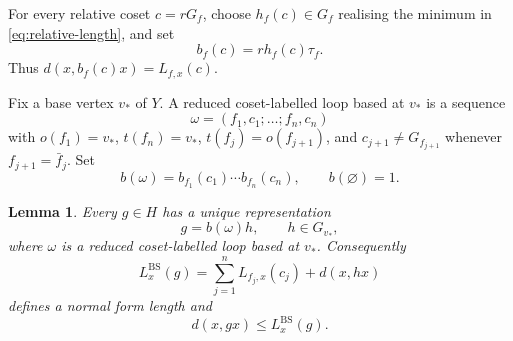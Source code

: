 \documentclass[11pt]{article}
\newtheorem{lemma}[lemma]{Lemma}
\theoremstyle{definition}
\newcommand{\BS}{\mathrm{BS}}
\begin{document}
For every relative coset $c=rG_f$, choose $h_f(c)\in G_f$ realising the minimum in
\eqref{eq:relative-length}, and set
\begin{equation}\label{eq:minimising-label}
 b_f(c)=rh_f(c)\tau_f.
\end{equation}
Thus $d(x,b_f(c)x)=L_{f,x}(c)$.

Fix a base vertex $v_*$ of $Y$.  A reduced coset-labelled loop based at $v_*$ is a sequence
\[
 \omega=(f_1,c_1;\dots;f_n,c_n)
\]
with $o(f_1)=v_*$, $t(f_n)=v_*$, $t(f_j)=o(f_{j+1})$, and
$c_{j+1}\ne G_{f_{j+1}}$ whenever $f_{j+1}=\bar f_j$.  Set
\[
 b(\omega)=b_{f_1}(c_1)\cdots b_{f_n}(c_n),
 \qquad b(\varnothing)=1.
\]

\begin{lemma}
\label{lem:bass-serre-normal-form}
Every $g\in H$ has a unique representation
\begin{equation}\label{eq:bass-serre-normal-form}
 g=b(\omega)h,
 \qquad h\in G_{v_*},
\end{equation}
where $\omega$ is a reduced coset-labelled loop based at $v_*$.  Consequently
\begin{equation}\label{eq:bass-serre-length}
 L^{\BS}_x(g)=\sum_{j=1}^nL_{f_j,x}(c_j)+d(x,hx)
\end{equation}
defines a normal form length and
\begin{equation}\label{eq:bass-serre-subadditive-upper}
 d(x,gx)\le L^{\BS}_x(g).
\end{equation}
\end{lemma}
\end{document}

